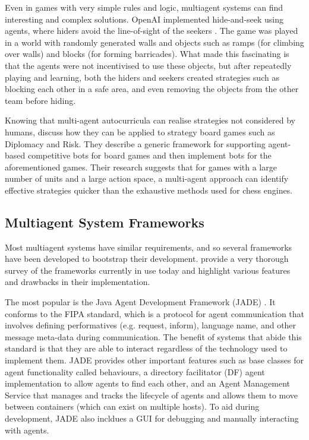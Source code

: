 \documentclass{article}
\begin{document}
Even in games with very simple rules and logic, multiagent systems can find interesting and complex solutions. OpenAI implemented hide-and-seek using agents, where hiders avoid the line-of-sight of the seekers \cite{openaiemergent}. The game was played in a world with randomly generated walls and objects such as ramps (for climbing over walls) and blocks (for forming barricades). What made this fascinating is that the agents were not incentivised to use these objects, but after repeatedly playing and learning, both the hiders and seekers created strategies such as blocking each other in a safe area, and even removing the objects from the other team before hiding.

Knowing that multi-agent autocurricula can realise strategies not considered by humans, \cite{masboardgames} discuss how they can be applied to strategy board games such as Diplomacy and Risk. They describe a generic framework for supporting agent-based competitive bots for board games and then implement bots for the aforementioned games. Their research suggests that for games with a large number of units and a large action space, a multi-agent approach can identify effective strategies quicker than the exhaustive methods used for chess engines. 

\subsection{Multiagent System Frameworks}

Most multiagent systems have similar requirements, and so several frameworks have been developed to bootstrap their development. \cite{massurvey} provide a very thorough survey of the frameworks currently in use today and highlight various features and drawbacks in their implementation. 

The most popular is the Java Agent Development Framework (JADE) \cite{jade}. It conforms to the FIPA standard, which is a protocol for agent communication that involves defining performatives (e.g. request, inform), language name, and other message meta-data during communication. The benefit of systems that abide this standard is that they are able to interact regardless of the technology used to implement them. JADE provides other important features such as base classes for agent functionality called behaviours, a directory facilitator (DF) agent implementation to allow agents to find each other, and an Agent Management Service that manages and tracks the lifecycle of agents and allows them to move between containers (which can exist on multiple hosts). To aid during development, JADE also incldues a GUI for debugging and manually interacting with agents.
\end{document}
